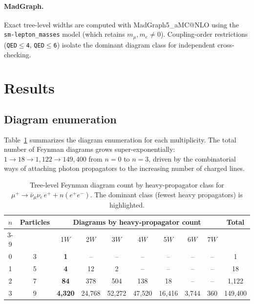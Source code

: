 \documentclass[11pt,a4paper]{article}
\begin{document}
\paragraph{MadGraph.}
Exact tree-level widths are computed with MadGraph5\_aMC@NLO using the
\texttt{sm-lepton\_masses} model (which retains $m_\mu, m_e \neq 0$).
Coupling-order restrictions (\texttt{QED$\leq$4}, \texttt{QED$\leq$6})
isolate the dominant diagram class for independent cross-checking.

\section{Results}
\label{sec:results}

\subsection{Diagram enumeration}
\label{sec:diagrams}

Table~\ref{tab:diagrams} summarizes the diagram enumeration for each
multiplicity.
The total number of Feynman diagrams grows super-exponentially:
$1 \to 18 \to 1{,}122 \to 149{,}400$ from $n=0$ to $n=3$, driven
by the combinatorial ways of attaching photon propagators to the
increasing number of charged lines.

\begin{table}[h]
\centering
\caption{Tree-level Feynman diagram count by heavy-propagator class
for $\mu^+ \to \bar\nu_\mu\nu_e\,e^+ + n(e^+e^-)$.
The dominant class (fewest heavy propagators) is highlighted.}
\label{tab:diagrams}
\begin{tabular}{cccccccccc}
\toprule
$n$ & Particles & \multicolumn{7}{c}{Diagrams by heavy-propagator count}
    & Total \\
\cmidrule(lr){3-9}
    &           & 1$W$ & 2$W$ & 3$W$ & 4$W$ & 5$W$ & 6$W$ & 7$W$ & \\
\midrule
0 & 3  & \textbf{1} & -- & -- & -- & -- & -- & -- & 1 \\
1 & 5  & \textbf{4} & 12 & 2  & -- & -- & -- & -- & 18 \\
2 & 7  & \textbf{84} & 378 & 504 & 138 & 18 & -- & -- & 1{,}122 \\
3 & 9  & \textbf{4{,}320} & 24{,}768 & 52{,}272 & 47{,}520 & 16{,}416 & 3{,}744 & 360 & 149{,}400 \\
\bottomrule
\end{tabular}
\end{table}
\end{document}
